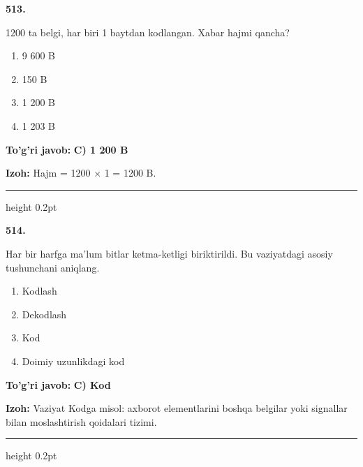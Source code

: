 \documentclass[10pt,a4paper,oneside]{article}
\begin{document}
\noindent\textbf{\color{ink}513.}
\par
1200 ta belgi, har biri 1 baytdan kodlangan. Xabar hajmi qancha?
\begin{enumerate}[label=\Alph*),leftmargin=9mm]
\item 9 600 B
\item 150 B
\item 1 200 B
\item 1 203 B
\end{enumerate}
\begin{tcolorbox}[enhanced,breakable,colback=teal!4,colframe=teal!50!black,boxrule=0.5pt,arc=1.1mm,left=3mm,right=3mm,top=1.7mm,bottom=1.7mm,before skip=2mm,after skip=2mm]
\textbf{\color{teal}To'g'ri javob:} \textbf{C) 1 200 B}
\par\smallskip
\textbf{Izoh:} Hajm = 1200 \ensuremath{\times} 1 = 1200 B.
\end{tcolorbox}
\vspace{2mm}\hrule height 0.2pt \vspace{3mm}

\noindent\textbf{\color{ink}514.}
\par
Har bir harfga ma'lum bitlar ketma-ketligi biriktirildi. Bu vaziyatdagi asosiy tushunchani aniqlang.
\begin{enumerate}[label=\Alph*),leftmargin=9mm]
\item Kodlash
\item Dekodlash
\item Kod
\item Doimiy uzunlikdagi kod
\end{enumerate}
\begin{tcolorbox}[enhanced,breakable,colback=teal!4,colframe=teal!50!black,boxrule=0.5pt,arc=1.1mm,left=3mm,right=3mm,top=1.7mm,bottom=1.7mm,before skip=2mm,after skip=2mm]
\textbf{\color{teal}To'g'ri javob:} \textbf{C) Kod}
\par\smallskip
\textbf{Izoh:} Vaziyat Kodga misol: axborot elementlarini boshqa belgilar yoki signallar bilan moslashtirish qoidalari tizimi.
\end{tcolorbox}
\vspace{2mm}\hrule height 0.2pt \vspace{3mm}
\end{document}
